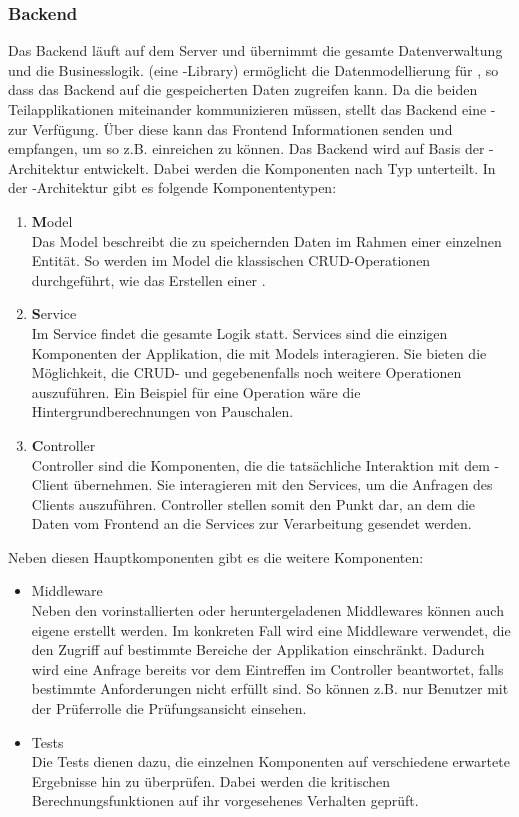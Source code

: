\subsubsection{Backend}
\label{sec:Planungsphase:Backend}

Das Backend läuft auf dem Server und übernimmt die gesamte Datenverwaltung und die Businesslogik.  (eine -Library) ermöglicht die Datenmodellierung für , so dass das Backend auf die gespeicherten Daten zugreifen kann.
Da die beiden Teilapplikationen miteinander kommunizieren müssen, stellt das Backend eine - zur Verfügung. Über diese kann das Frontend Informationen senden und empfangen, um so z.B.  einreichen zu können.
Das Backend wird auf Basis der -Architektur entwickelt. Dabei werden die Komponenten nach Typ unterteilt. In der -Architektur gibt es folgende Komponententypen:

\begin{enumerate}
  \item \textbf{M}odel\\
  Das Model beschreibt die zu speichernden Daten im Rahmen einer einzelnen Entität. So werden im Model die klassischen CRUD-Operationen durchgeführt, wie das Erstellen einer .
  \item \textbf{S}ervice\\
  Im Service findet die gesamte Logik statt. Services sind die einzigen Komponenten der Applikation, die mit Models interagieren. Sie bieten die Möglichkeit, die CRUD- und gegebenenfalls noch weitere Operationen auszuführen. Ein Beispiel für eine Operation wäre die Hintergrundberechnungen von Pauschalen.
  \item \textbf{C}ontroller\\
  Controller sind die Komponenten, die die tatsächliche Interaktion mit dem -Client übernehmen. Sie interagieren mit den Services, um die Anfragen des Clients auszuführen. Controller stellen somit den Punkt dar, an dem die Daten vom Frontend an die Services zur Verarbeitung gesendet werden.
\end{enumerate}

Neben diesen Hauptkomponenten gibt es die weitere Komponenten:

\begin{itemize}
  \item Middleware\\
Neben den vorinstallierten oder heruntergeladenen Middlewares können auch eigene erstellt werden. Im konkreten Fall wird eine Middleware verwendet, die den Zugriff auf bestimmte Bereiche der Applikation einschränkt. Dadurch wird eine Anfrage bereits vor dem Eintreffen im Controller beantwortet, falls bestimmte Anforderungen nicht erfüllt sind. So können z.B. nur Benutzer mit der Prüferrolle die Prüfungsansicht einsehen.
  \item Tests\\
  Die Tests dienen dazu, die einzelnen Komponenten auf verschiedene erwartete Ergebnisse hin zu überprüfen. Dabei werden die kritischen Berechnungsfunktionen auf ihr vorgesehenes Verhalten geprüft.
\end{itemize}

